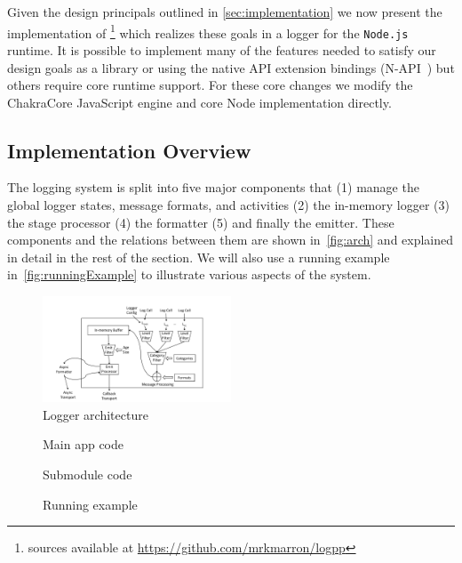 Given the design principals outlined in \autoref{sec:implementation} we now 
present the implementation of \projn\footnote{\projn sources available at 
\url{https://github.com/mrkmarron/logpp}} which realizes these goals in a logger 
for the \texttt{Node.js}~\cite{Node} runtime. It is possible to implement many 
of the features needed to satisfy our design goals as a library or using the 
native API extension bindings (N-API~\cite{NAPI}) but others require core 
runtime support. For these core changes we modify the ChakraCore JavaScript 
engine and core Node implementation directly.

\subsection{Implementation Overview}
The logging system is split into five major components that (1) manage the 
global logger states, message formats, and activities (2) the in-memory logger 
(3) the stage processor (4) the formatter (5) and finally the emitter. These 
components and the relations between them are shown in~\autoref{fig:arch} and 
explained in detail in the rest of the section. We will also use a running 
example in~\autoref{fig:runningExample} to illustrate various aspects of the 
system.

\begin{figure}
    \centering
    \includegraphics[width=0.5\textwidth,angle=-90]{Figures/ArchDiagram}
    \caption{Logger architecture}
    \label{fig:arch}
\end{figure}

\begin{figure}[t]
\begin{minipage}[b]{0.47\textwidth}
     
    \caption{Main app code}
    \label{fig:appmain}
\end{minipage}
\begin{minipage}[b]{0.47\textwidth}
    
    \caption{Submodule code}
    \label{fig:appsub}
\end{minipage}
\caption{Running example}
\label{fig:runningExample}
\end{figure}

